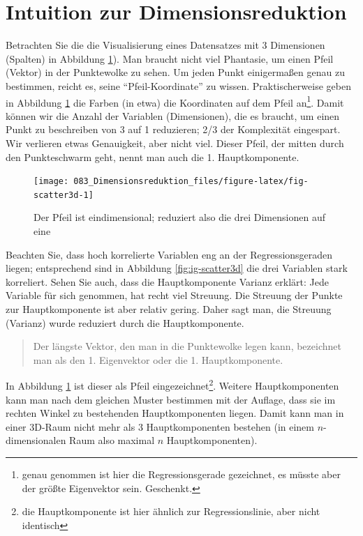 \documentclass[12pt,ngerman,]{book}
\let\rmarkdownfootnote\footnote%
\def\footnote{\protect\rmarkdownfootnote}
\theoremstyle{definition}
\theoremstyle{definition}
\theoremstyle{remark}
\begin{document}
\section{Intuition zur
Dimensionsreduktion}\label{intuition-zur-dimensionsreduktion}

Betrachten Sie die die Visualisierung eines Datensatzes mit 3
Dimensionen (Spalten) in Abbildung \ref{fig:fig-scatter3d}). Man braucht
nicht viel Phantasie, um einen Pfeil (Vektor) in der Punktewolke zu
sehen. Um jeden Punkt einigermaßen genau zu bestimmen, reicht es, seine
``Pfeil-Koordinate'' zu wissen. Praktischerweise geben in Abbildung
\ref{fig:fig-scatter3d} die Farben (in etwa) die Koordinaten auf dem
Pfeil an\footnote{genau genommen ist hier die Regressionsgerade
  gezeichnet, es müsste aber der größte Eigenvektor sein. Geschenkt.}.
Damit können wir die Anzahl der Variablen (Dimensionen), die es braucht,
um einen Punkt zu beschreiben von 3 auf 1 reduzieren; 2/3 der
Komplexität eingespart. Wir verlieren etwas Genauigkeit, aber nicht
viel. Dieser Pfeil, der mitten durch den Punkteschwarm geht, nennt man
auch die 1. Hauptkomponente.

\begin{figure}

{\centering \texttt{[image: 083\_Dimensionsreduktion\_files/figure-latex/fig-scatter3d-1]} 

}

\caption{Der Pfeil ist eindimensional; reduziert also die drei Dimensionen auf eine}\label{fig:fig-scatter3d}
\end{figure}

Beachten Sie, dass hoch korrelierte Variablen eng an der
Regressionsgeraden liegen; entsprechend sind in Abbildung
\ref{fig:ig-scatter3d} die drei Variablen stark korreliert. Sehen Sie
auch, dass die Hauptkomponente Varianz erklärt: Jede Variable für sich
genommen, hat recht viel Streuung. Die Streuung der Punkte zur
Hauptkomponente ist aber relativ gering. Daher sagt man, die Streuung
(Varianz) wurde reduziert durch die Hauptkomponente.

\begin{quote}
Der längste Vektor, den man in die Punktewolke legen kann, bezeichnet
man als den 1. Eigenvektor oder die 1. Hauptkomponente.
\end{quote}

In Abbildung \ref{fig:fig-scatter3d} ist dieser als Pfeil
eingezeichnet\footnote{die Hauptkomponente ist hier ähnlich zur
  Regressionslinie, aber nicht identisch}. Weitere Hauptkomponenten kann
man nach dem gleichen Muster bestimmen mit der Auflage, dass sie im
rechten Winkel zu bestehenden Hauptkomponenten liegen. Damit kann man in
einer 3D-Raum nicht mehr als 3 Hauptkomponenten bestehen (in einem
\(n\)-dimensionalen Raum also maximal \(n\) Hauptkomponenten).
\end{document}
